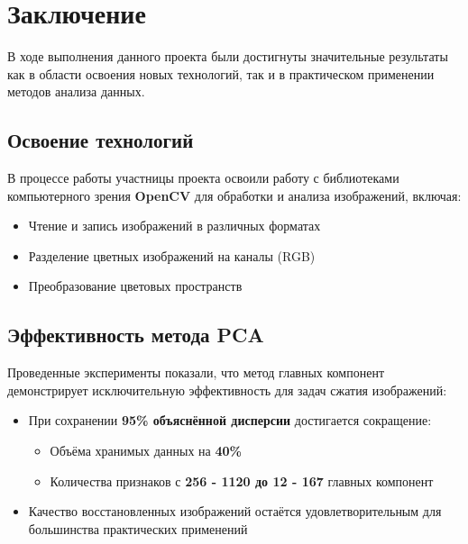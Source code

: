\documentclass[14pt]{extarticle}
\begin{document}
\section{Заключение}

В ходе выполнения данного проекта были достигнуты значительные результаты как в области освоения новых технологий, так и в практическом применении методов анализа данных. 

\subsection{Освоение технологий}
В процессе работы участницы проекта освоили работу с библиотеками компьютерного зрения \textbf{OpenCV} для обработки и анализа изображений, включая:
    \begin{itemize}
        \item Чтение и запись изображений в различных форматах
        \item Разделение цветных изображений на каналы (RGB)
        \item Преобразование цветовых пространств
    \end{itemize}

\subsection{Эффективность метода PCA}
Проведенные эксперименты показали, что метод главных компонент демонстрирует исключительную эффективность для задач сжатия изображений:
\begin{itemize}
    \item При сохранении \textbf{95\% объяснённой дисперсии} достигается сокращение:
    \begin{itemize}
        \item Объёма хранимых данных на \textbf{40\%}
        \item Количества признаков с \textbf{256 - 1120 до 12 - 167} главных компонент
    \end{itemize}
    
    \item Качество восстановленных изображений остаётся удовлетворительным для большинства практических применений
    
\end{itemize}
\end{document}
